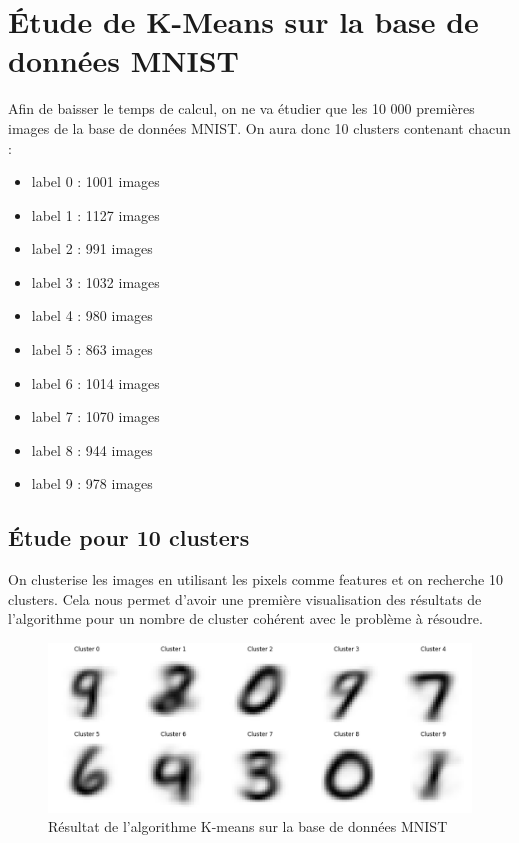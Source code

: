 \documentclass[french,a4paper,18pt]{article}
\begin{document}
\section{Étude de K-Means sur la base de données MNIST}


Afin de baisser le temps de calcul, on ne va étudier que les 10 000 premières images de la base de données MNIST.
On aura donc 10 clusters contenant chacun : 
\begin{itemize}
    \item label 0 : 1001 images
    \item label 1 : 1127 images
    \item label 2 : 991 images
    \item label 3 : 1032 images
    \item label 4 : 980 images
    \item label 5 : 863 images
    \item label 6 : 1014 images
    \item label 7 : 1070 images
    \item label 8 : 944 images
    \item label 9 : 978 images
\end{itemize}

\subsection{Étude pour 10 clusters}

On clusterise les images en utilisant les pixels comme features et on recherche 10 clusters.
Cela nous permet d'avoir une première visualisation des résultats de l'algorithme pour un nombre 
de cluster cohérent avec le problème à résoudre.

\begin{figure}[h!]
    \centering
    \includegraphics[scale=0.25]{images/mnist_kmeans_ten_clusters.png}
    \caption{Résultat de l'algorithme K-means sur la base de données MNIST}\label{fig:mnist_kmeans}
\end{figure}
\end{document}
